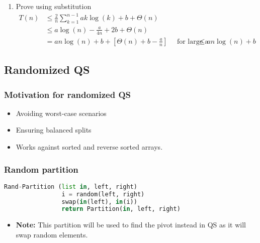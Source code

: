 \begin{derivation}
\begin{enumerate}
            \item Prove using substitution
            \begin{align*}
                T(n) &\leq \frac{2}{n} \sum_{k=1}^{n-1} a k \log(k) + b + \Theta(n) \\
                &\leq a \log(n) - \frac{a}{4n} + 2b + \Theta(n) \\
                &= a n \log(n) + b + \left[\Theta(n) + b - \frac{a}{n} \right] \quad \text{ for large a}
                &\leq an \log(n) + b
            \end{align*}
        \end{enumerate}
    \end{derivation}

\subsection{Randomized QS} 
    \subsubsection{Motivation for randomized QS}
    \begin{intuition}
        \begin{itemize}
            \item Avoiding worst-case scenarios
            \item Ensuring balanced splits
            \item Works against sorted and reverse sorted arrays.
        \end{itemize}
    \end{intuition}

    \subsubsection{Random partition}
    \begin{definition}
        \begin{lstlisting}[language=Python, caption={Rand-Partition Function Pseudocode}]
            Rand-Partition (list in, left, right)
                i = random(left, right)
                swap(in(left), in(i))
                return Partition(in, left, right)
        \end{lstlisting}
        \begin{itemize}
            \item \textbf{Note:} This partition will be used to find the pivot instead in QS as it will swap random elements.
        \end{itemize}
    \end{definition}

